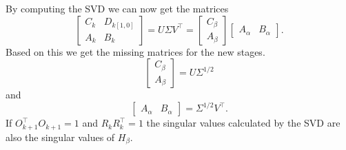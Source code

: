 \documentclass[numbers=noenddot,doctype=mastersthesis,BCOR=15mm,biblatex]{ldvbook}%
\begin{document}
By computing the SVD we can now get the matrices
\begin{equation}
\begin{bmatrix}
C_k & D_{k[1,0]}\\
A_k & B_k
\end{bmatrix} = U \Sigma V^\top = \begin{bmatrix} C_\beta \\  A_\beta \end{bmatrix}
\begin{bmatrix} A_\alpha &  B_\alpha  \end{bmatrix}
.
\end{equation}
Based on this we get the missing matrices for the new stages.
\begin{equation}
\begin{bmatrix} C_\beta \\  A_\beta \end{bmatrix} = U \Sigma^{1/2}
\end{equation}
and
\begin{equation}
\begin{bmatrix} A_\alpha &  B_\alpha  \end{bmatrix} = \Sigma^{1/2} V^\top
.
\end{equation}
If $O_{k+1}^\top O_{k+1} = 1$ and $R_k  R_k^\top = 1$ the singular values calculated by the SVD are also the singular values of $H_\beta$.
\end{document}
